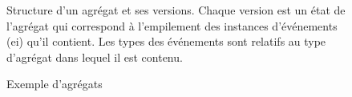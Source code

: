 \begin{figure}
	\centering
	\caption{Exemple d'agrégats}{Structure d'un agrégat et ses versions. Chaque 
	version est un état de l'agrégat qui correspond à l'empilement des instances 
	d'événements (ei) qu'il contient. Les types des événements sont relatifs au type 
	d'agrégat dans lequel il est contenu.}
	\label{fig:aggregate}
\end{figure}

